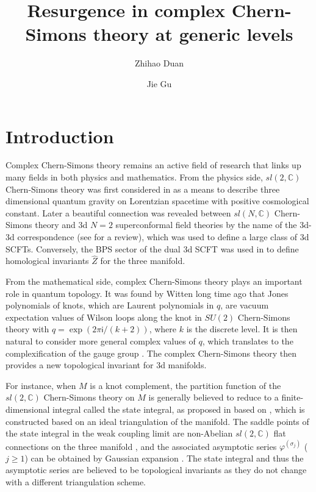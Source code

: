 \documentclass[a4paper,11pt]{article}	%
\title{\boldmath Resurgence in complex Chern-Simons theory at generic levels}
\author[a]{Zhihao Duan}
\author[b]{Jie Gu}
\affiliation[a]{Korea Institute for Advanced Study\\
  85 Hoegiro, Dongdaemun-gu, Seoul 02455, Korea}
\affiliation[b]{School of Phyiscs and Shing-Tung Yau Center\\
  Southeast University, Nanjing 210096, China}%
\def\IC{\mathbb{C}}
\newcommand{\ri}{{\mathsf{i}}}
\newcommand{\s}{\sigma}
\begin{document}
\maketitle
\flushbottom

\section{Introduction}
\label{sc:intr}


Complex Chern-Simons theory remains an active field of research that
links up many fields in both physics and mathematics.  From the
physics side, $sl(2,\IC)$ Chern-Simons theory was first considered in
\cite{Witten:1988hc} as a means to describe three dimensional quantum
gravity on Lorentzian spacetime with positive cosmological constant.
Later a beautiful connection was revealed between $sl(N,\IC)$
Chern-Simons theory and 3d $N=2$ superconformal field theories by the
name of the 3d-3d correspondence
\cite{Dimofte:2010tz,Terashima:2011qi,Dimofte:2011ju,Dimofte:2013iv}
(see \cite{Dimofte:2014ija} for a review), which was used to define a
large class of 3d SCFTs.  Conversely, the BPS sector of the dual 3d
SCFT was used in \cite{Gukov:2016gkn,Gukov:2017kmk} to define
homological invariants $\widehat{Z}$ for the three manifold.



From the mathematical side, complex Chern-Simons theory plays an
important role in quantum topology.  It was found by Witten long time
ago \cite{Witten:1988hf} that Jones polynomials of knots, which are
Laurent polynomials in $q$, are vacuum expectation values of Wilson
loops along the knot in $SU(2)$ Chern-Simons theory with
$q = \exp(2\pi\ri/(k+2))$, where $k$ is the discrete level.  It is
then natural to consider more general complex values of $q$, which
translates to the complexification of the gauge group
\cite{Witten:2010cx}.
The complex Chern-Simons theory then provides a new topological
invariant for 3d manifolds.

For instance, when $M$ is a knot complement, the partition function of
the $sl(2,\IC)$ Chern-Simons theory on $M$ is generally believed to
reduce to a finite-dimensional integral called the state integral, as
proposed in
\cite{Andersen:2011bt,Andersen:2014aoa,Andersen:2016ugz,Dimofte:2011py,Dimofte:2014zga}
based on \cite{Hikami:2006cv,Dimofte:2009yn}, which is constructed
based on an ideal triangulation of the manifold.
%
The saddle points of the state integral in the weak coupling limit are
non-Abelian $sl(2,\IC)$ flat connections on the three manifold
\cite{Witten:1988hf}, and the associated asymptotic series
$\varphi^{(\s_j)}$ ($j\geq 1$) can be obtained by Gaussian expansion
\cite{Dimofte:2009yn}.  The state integral and thus the asymptotic
series are believed to be topological invariants as they do not change
with a different triangulation scheme.
\end{document}

